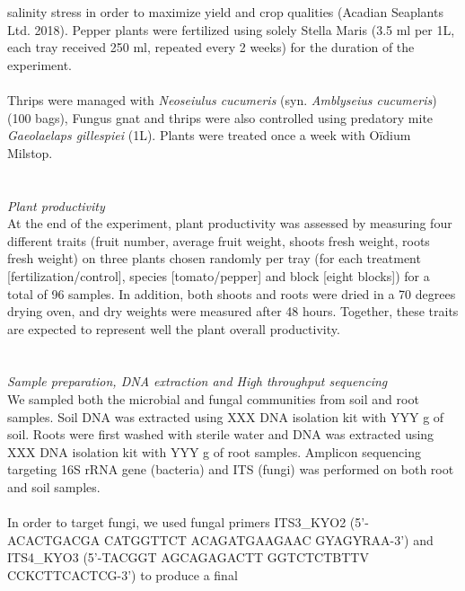 \documentclass[11pt,]{article}
\begin{document}
salinity stress in order to maximize yield and crop qualities (Acadian
Seaplants Ltd. 2018). Pepper plants were fertilized using solely Stella
Maris (3.5 ml per 1L, each tray received 250 ml, repeated every 2 weeks)
for the duration of the experiment.\\
\hspace*{0.333em}\\
Thrips were managed with \emph{Neoseiulus cucumeris} (syn.
\emph{Amblyseius cucumeris}) (100 bags), Fungus gnat and thrips were
also controlled using predatory mite \emph{Gaeolaelaps gillespiei} (1L).
Plants were treated once a week with Oïdium Milstop.\\
\hspace*{0.333em}\\
\hspace*{0.333em}\\
\emph{Plant productivity}\\
At the end of the experiment, plant productivity was assessed by
measuring four different traits (fruit number, average fruit weight,
shoots fresh weight, roots fresh weight) on three plants chosen randomly
per tray (for each treatment {[}fertilization/control{]}, species
{[}tomato/pepper{]} and block {[}eight blocks{]}) for a total of 96
samples. In addition, both shoots and roots were dried in a 70 degrees
drying oven, and dry weights were measured after 48 hours. Together,
these traits are expected to represent well the plant overall
productivity.\\
\hspace*{0.333em}\\
\hspace*{0.333em}\\
\emph{Sample preparation, DNA extraction and High throughput
sequencing}\\
We sampled both the microbial and fungal communities from soil and root
samples. Soil DNA was extracted using XXX DNA isolation kit with YYY g
of soil. Roots were first washed with sterile water and DNA was
extracted using XXX DNA isolation kit with YYY g of root samples.
Amplicon sequencing targeting 16S rRNA gene (bacteria) and ITS (fungi)
was performed on both root and soil samples.\\
\hspace*{0.333em}\\
In order to target fungi, we used fungal primers ITS3\_KYO2
(5'-ACACTGACGA CATGGTTCT ACAGATGAAGAAC GYAGYRAA-3') and ITS4\_KYO3
(5'-TACGGT AGCAGAGACTT GGTCTCTBTTV CCKCTTCACTCG-3') to produce a final
\end{document}
